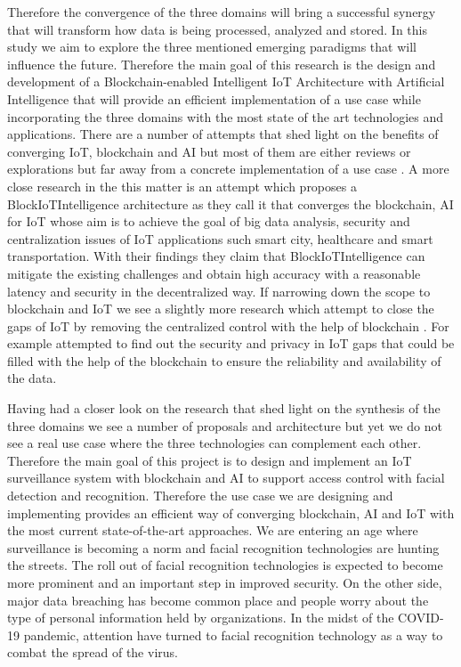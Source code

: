 Therefore the convergence of the three domains will bring a successful synergy that will transform how data is being processed, analyzed and stored. In this study we aim to explore the three mentioned emerging paradigms that will influence the future. Therefore the main goal of this research is the design and development of a Blockchain-enabled Intelligent IoT Architecture with Artificial Intelligence that will provide an efficient implementation of a use case while incorporating the three domains with the most state of the art technologies and applications. 
There are a number of attempts that shed light on the benefits of converging IoT, blockchain and AI \cite{bdcc4040028} but most of them are either reviews or explorations but far away from a concrete implementation of a use case \cite{Parker_Bach_2020}. A more close research in the this matter is an attempt \cite{blockiotintelligent} which proposes a BlockIoTIntelligence architecture as they call it that converges the blockchain, AI for IoT whose aim is to achieve the goal of big data analysis, security and centralization issues of IoT applications such smart city, healthcare and smart transportation. With their findings they claim that BlockIoTIntelligence can mitigate the existing challenges and obtain high accuracy with a reasonable latency and security in the decentralized way. 
If narrowing down the scope to blockchain and IoT we see a slightly more research which attempt to close the gaps of IoT by removing the centralized control with the help of blockchain \cite{9314805}.
For example \cite{10.1145/3417987} attempted to find out the security and privacy in IoT  gaps that could be filled with the help of the blockchain to ensure the reliability and availability of the data. 

Having had a closer look on the research that shed light on the synthesis of the three domains we see a number of proposals and architecture but yet we do not see a real use case where the three technologies can complement each other. 
Therefore the main goal of this project is to design and implement an IoT surveillance system with blockchain and AI to support access control with facial detection and recognition. Therefore the use case we are designing and implementing provides an efficient way of converging blockchain, AI and IoT with the most current state-of-the-art approaches. 
We are entering an age where surveillance is becoming a norm and facial recognition technologies are hunting the streets. The roll out of facial recognition technologies is expected to become more prominent and an important step in improved security. On the other side, major data breaching has become common place and people worry about the type of personal information held by organizations. In the midst of the COVID-19 pandemic, attention have turned to facial recognition technology as a way to combat the spread of the virus.

